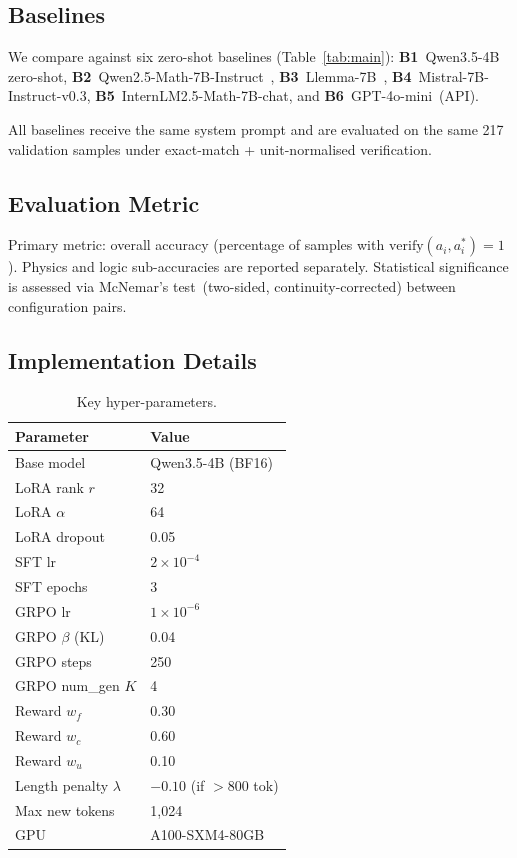 \documentclass{ieeeaccess}
\newcommand{\basemodelname}{Qwen3.5-4B}
\begin{document}
\subsection{Baselines}

We compare against six zero-shot baselines (Table~\ref{tab:main}):
\textbf{B1}~\basemodelname{} zero-shot,
\textbf{B2}~Qwen2.5-Math-7B-Instruct~\cite{Yang2024},
\textbf{B3}~Llemma-7B~\cite{Azerbayev2024},
\textbf{B4}~Mistral-7B-Instruct-v0.3,
\textbf{B5}~InternLM2.5-Math-7B-chat, and
\textbf{B6}~GPT-4o-mini~(API).

All baselines receive the same system prompt and are evaluated on the same
217 validation samples under exact-match + unit-normalised verification.

\subsection{Evaluation Metric}

Primary metric: overall accuracy (percentage of samples with
$\mathrm{verify}(a_i, a_i^*) = 1$).
Physics and logic sub-accuracies are reported separately.
Statistical significance is assessed via McNemar's test~(two-sided,
continuity-corrected) between configuration pairs.

\subsection{Implementation Details}

\begin{table}[t]
  \centering
  \caption{Key hyper-parameters.}
  \label{tab:hyperparams}
  \begin{tabular}{ll}
    \toprule
    Parameter & Value \\
    \midrule
    Base model         & \basemodelname{} (BF16) \\
    LoRA rank $r$      & 32 \\
    LoRA $\alpha$      & 64 \\
    LoRA dropout       & 0.05 \\
    SFT lr             & $2\times10^{-4}$ \\
    SFT epochs         & 3 \\
    GRPO lr            & $1\times10^{-6}$ \\
    GRPO $\beta$ (KL)  & 0.04 \\
    GRPO steps         & 250 \\
    GRPO num\_gen $K$  & 4 \\
    Reward $w_f$       & 0.30 \\
    Reward $w_c$       & 0.60 \\
    Reward $w_u$       & 0.10 \\
    Length penalty $\lambda$ & $-0.10$ (if $>$800 tok) \\
    Max new tokens     & 1,024 \\
    GPU                & A100-SXM4-80GB \\
    \bottomrule
  \end{tabular}
\end{table}
\end{document}
